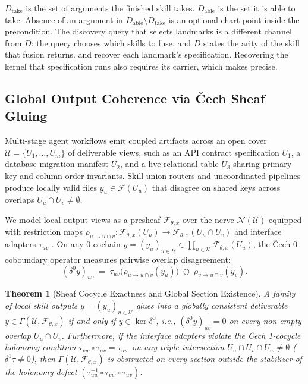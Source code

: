 \documentclass[11pt]{article}
\theoremstyle{definition}
\theoremstyle{plain}
\newtheorem{theorem}{Theorem}
\newcommand{\Ucal}{\mathcal{U}}
\newcommand{\Fcal}{\mathcal{F}}
\newcommand{\Ncal}{\mathcal{N}}
\begin{document}
$D_{\mathrm{take}}$ is the set of arguments the finished skill takes. $D_{\mathrm{able}}$ is the set it is able to take. Absence of an argument in $D_{\mathrm{able}} \setminus D_{\mathrm{take}}$ is an optional chart point inside the precondition. The discovery query that selects landmarks is a different channel from $D$: the query chooses which skills to fuse, and $D$ states the arity of the skill that fusion returns.  and  recover each landmark's specification. Recovering the kernel that specification runs also requires its carrier, which  makes precise.

\subsection{Global Output Coherence via \v{C}ech Sheaf Gluing}
\label{subsec:sheaf}

Multi-stage agent workflows emit coupled artifacts across an open cover $\Ucal = \{U_1, \dots, U_m\}$ of deliverable views, such as an API contract specification $U_1$, a database migration manifest $U_2$, and a live relational table $U_3$ sharing primary-key and column-order invariants. Skill-union routers and uncoordinated pipelines produce locally valid files $y_u \in \Fcal(U_u)$ that disagree on shared keys across overlaps $U_u \cap U_v \neq \emptyset$.

We model local output views as a presheaf $\Fcal_{\theta, x}$ over the nerve $\Ncal(\Ucal)$ equipped with restriction maps $\rho_{u \to u \cap v} : \Fcal_{\theta, x}(U_u) \to \Fcal_{\theta, x}(U_u \cap U_v)$ and interface adapters $\tau_{uv}$ \citep{maclane1992sheaves}. On any 0-cochain $y = (y_u)_{u \in \Ucal} \in \prod_{u \in \Ucal} \Fcal_{\theta, x}(U_u)$, the \v{C}ech 0-coboundary operator measures pairwise overlap disagreement:
\begin{equation}
  (\delta^0 y)_{uv} \;=\; \tau_{uv}\!\bigl(\rho_{u \to u \cap v}(y_u)\bigr) \;\ominus\; \rho_{v \to u \cap v}(y_v).
  \label{eq:coboundary}
\end{equation}

\begin{theorem}[Sheaf Cocycle Exactness and Global Section Existence]
\label{thm:sheaf}
A family of local skill outputs $y = (y_u)_{u \in \Ucal}$ glues into a globally consistent deliverable $y \in \Gamma(\Ucal, \Fcal_{\theta, x})$ if and only if $y \in \ker \delta^0$, i.e., $(\delta^0 y)_{uv} = 0$ on every non-empty overlap $U_u \cap U_v$. Furthermore, if the interface adapters violate the \v{C}ech 1-cocycle holonomy condition $\tau_{vw} \circ \tau_{uv} = \tau_{uw}$ on any triple intersection $U_u \cap U_v \cap U_w \neq \emptyset$ ($\delta^1 \tau \neq 0$), then $\Gamma(\Ucal, \Fcal_{\theta, x})$ is obstructed on every section outside the stabilizer of the holonomy defect $(\tau_{uw}^{-1} \circ \tau_{vw} \circ \tau_{uv})$.
\end{theorem}
\end{document}
